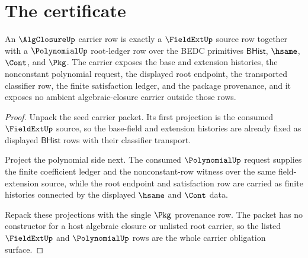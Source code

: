 \section{The certificate}
\label{sec:algclosure-certificate}

\begin{theorem}
\label{thm:algclosure-root-carrier-obligation-surface}
An $\AlgClosureUp$ carrier row is exactly a $\FieldExtUp$ source row together
with a $\PolynomialUp$ root-ledger row over the BEDC primitives
$\mathsf{BHist}$, $\hsame$, $\Cont$, and $\Pkg$. The carrier exposes the base
and extension histories, the nonconstant polynomial request, the displayed
root endpoint, the transported classifier row, the finite satisfaction ledger,
and the package provenance, and it exposes no ambient algebraic-closure
carrier outside those rows.
\end{theorem}
\begin{proof}
Unpack the seed carrier packet. Its first projection is the consumed
$\FieldExtUp$ source, so the base-field and extension histories are already
fixed as displayed $\mathsf{BHist}$ rows with their classifier transport.

Project the polynomial side next. The consumed $\PolynomialUp$ request supplies
the finite coefficient ledger and the nonconstant-row witness over the same
field-extension source, while the root endpoint and satisfaction row are
carried as finite histories connected by the displayed $\hsame$ and $\Cont$
data.

Repack these projections with the single $\Pkg$ provenance row. The packet has
no constructor for a host algebraic closure or unlisted root carrier, so the
listed $\FieldExtUp$ and $\PolynomialUp$ rows are the whole carrier obligation
surface.
\end{proof}

